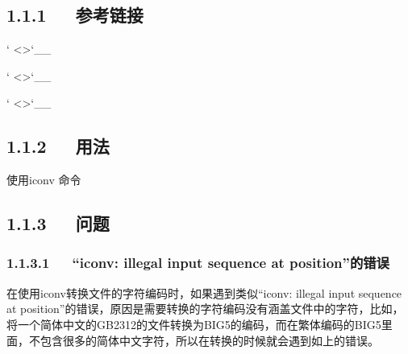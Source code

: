 \documentclass[letterpaper,12pt,english]{sphinxmanual}
\begin{document}
\subsection{1.1.1   参考链接}
\label{\detokenize{001software/001install/tools:id1}}
` <>`\_\_


` <>`\_\_

` <>`\_\_


\subsection{1.1.2   用法}
\label{\detokenize{001software/001install/tools:id2}}
使用iconv 命令

\begin{sphinxVerbatim}[commandchars=\\\{\}]
       

\end{sphinxVerbatim}


\subsection{1.1.3   问题}
\label{\detokenize{001software/001install/tools:id3}}

\subsubsection{1.1.3.1   “iconv: illegal input sequence at position”的错误}
\label{\detokenize{001software/001install/tools:iconv-illegal-input-sequence-at-position}}

在使用iconv转换文件的字符编码时，如果遇到类似“iconv: illegal input sequence at position”的错误，原因是需要转换的字符编码没有涵盖文件中的字符，比如，将一个简体中文的GB2312的文件转换为BIG5的编码，而在繁体编码的BIG5里面，不包含很多的简体中文字符，所以在转换的时候就会遇到如上的错误。
\end{document}
